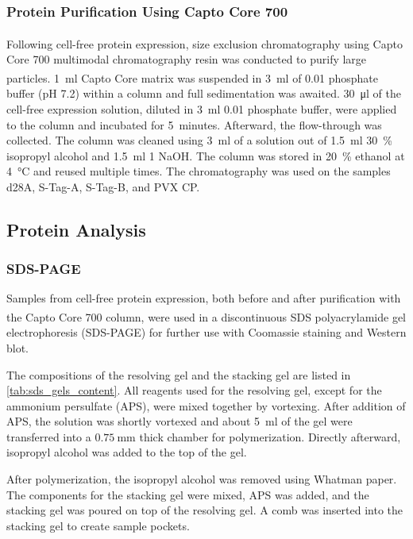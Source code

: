 \subsubsection{Protein Purification Using Capto Core 700}
Following cell-free protein expression, size exclusion chromatography using Capto\textsuperscript{\texttrademark} Core 700 multimodal chromatography resin was conducted to purify large particles. \SI{1}{\milli\litre} Capto\textsuperscript{\texttrademark} Core matrix was suspended in \SI{3}{\milli\litre} of \SI{0.01}{\Molar} phosphate buffer (pH 7.2) within a column and full sedimentation was awaited. \SI{30}{\micro\litre} of the cell-free expression solution, diluted in \SI{3}{\milli\litre} \SI{0.01}{\Molar} phosphate buffer, were applied to the column and incubated for 5~minutes. Afterward, the flow-through was collected. The column was cleaned using \SI{3}{\milli\litre} of a solution out of \SI{1.5}{\milli\litre} \SI{30}{\percent} isopropyl alcohol and \SI{1.5}{\milli\litre} \SI{1}{\Molar} NaOH. The column was stored in \SI{20}{\percent} ethanol at \SI{4}{\degreeCelsius} and reused multiple times. The chromatography was used on the samples d28A, S-Tag-A, S-Tag-B, and PVX CP. 

\subsection{Protein Analysis}
\subsubsection{SDS-PAGE}
Samples from cell-free protein expression, both before and after purification with the Capto\textsuperscript{\texttrademark} Core 700 column, were used in a discontinuous SDS polyacrylamide gel electrophoresis (SDS-PAGE) for further use with Coomassie staining and Western blot. 

The compositions of the resolving gel and the stacking gel are listed in \autoref{tab:sds_gels_content}. All reagents used for the resolving gel, except for the ammonium persulfate (APS), were mixed together by vortexing. After addition of APS, the solution was shortly vortexed and about \SI{5}{\milli\litre} of the gel were transferred into a $\SI{0.75}{\milli\metre}$ thick chamber for polymerization. Directly afterward, isopropyl alcohol was added to the top of the gel. 

After polymerization, the isopropyl alcohol was removed using Whatman paper. The components for the stacking gel were mixed, APS was added, and the stacking gel was poured on top of the resolving gel. A comb was inserted into the stacking gel to create sample pockets.

